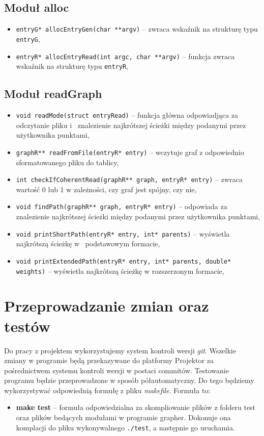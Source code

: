 \documentclass[10pt, a4paper]{report}
\begin{document}
    \subsection{Moduł alloc}
    \begin{itemize}
        \item \texttt{entryG* allocEntryGen(char **argv)} -- zwraca wskaźnik na strukturę typu \texttt{entryG},
        \item \texttt{entryR* allocEntryRead(int argc, char **argv)} -- funkcja zwraca wskaźnik na strukturę typu \texttt{entryR},
    \end{itemize}

    \subsection{Moduł readGraph}
    \begin{itemize}
        \item \texttt{void readMode(struct entryRead)} -- funkcja główna odpowiadjąca za odczytanie pliku i~ znalezienie najkrótszej ścieżki między podanymi przez użytkownika punktami,
        \item \texttt{graphR** readFromFile(entryR* entry)} -- wczytuje graf z odpowiednio sformatowanego pliku do tablicy,
        \item \texttt{int checkIfCoherentRead(graphR** graph, entryR* entry)} -- zwraca wartość 0 lub 1 w zależności, czy graf jest spójny, czy nie,
        \item \texttt{void findPath(graphR** graph, entryR* entry)} -- odpowiada za znalezienie najkrótszej ścieżki między podanymi przez użytkownika punktami,
        \item \texttt{void printShortPath(entryR* entry, int* parents)} -- wyświetla najkrótszą ścieżkę w~ podstawowym formacie,
        \item \texttt{void printExtendedPath(entryR* entry, int* parents, double* weights)} -- wyświetla najkrótszą ścieżkę w rozszerzonym formacie,

    \end{itemize}

    \section{Przeprowadzanie zmian oraz testów}
    Do pracy z projektem wykorzystujemy system kontroli wersji \textit{git}. Wszelkie zmiany w programie będą przekazywane do platformy
    Projektor za pośrednictwem systemu kontroli wersji w postaci commitów. Testowanie programu będzie przeprowadzone w sposób półautomatyczny.
    Do tego będziemy wykorzystywać odpowiednią formułę z pliku \textit{makefile}. 
    Formuła to:
    \begin{itemize}
        \item \textbf{make test} -- formuła odpowiedzialna za skompliowanie plików z folderu test oraz plików bedących modułami w programie grapher. Dokonuje ona komplacji do pliku wykonywalnego \texttt{./test}, a następnie go uruchamia.
    \end{itemize}
  
\end{document}
